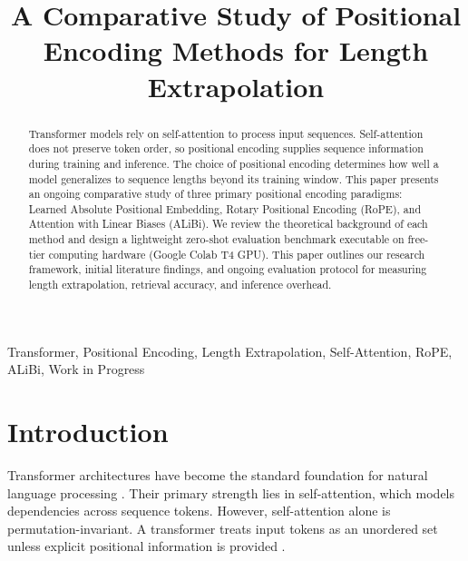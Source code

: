 \documentclass[conference]{IEEEtran}
\begin{document}
\title{A Comparative Study of Positional Encoding Methods for Length Extrapolation}

\author{
}

\maketitle

\begin{abstract}
Transformer models rely on self-attention to process input sequences. Self-attention does not preserve token order, so positional encoding supplies sequence information during training and inference. The choice of positional encoding determines how well a model generalizes to sequence lengths beyond its training window. This paper presents an ongoing comparative study of three primary positional encoding paradigms: Learned Absolute Positional Embedding, Rotary Positional Encoding (RoPE), and Attention with Linear Biases (ALiBi). We review the theoretical background of each method and design a lightweight zero-shot evaluation benchmark executable on free-tier computing hardware (Google Colab T4 GPU). This paper outlines our research framework, initial literature findings, and ongoing evaluation protocol for measuring length extrapolation, retrieval accuracy, and inference overhead.
\end{abstract}

\begin{IEEEkeywords}
Transformer, Positional Encoding, Length Extrapolation, Self-Attention, RoPE, ALiBi, Work in Progress
\end{IEEEkeywords}

\section{Introduction}
\label{sec:introduction}

Transformer architectures have become the standard foundation for natural language processing \cite{vaswani2017,touvron2023}. Their primary strength lies in self-attention, which models dependencies across sequence tokens. However, self-attention alone is permutation-invariant. A transformer treats input tokens as an unordered set unless explicit positional information is provided \cite{vaswani2017}.
\end{document}
